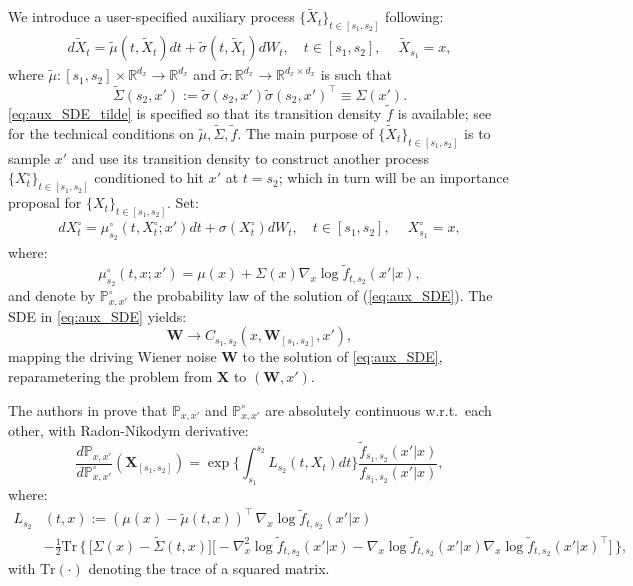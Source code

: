 \documentclass[english,13pt]{article}
\numberwithin{equation}{section}
\begin{document}
We introduce a user-specified auxiliary process $\{\tilde{X}_t\}_{t\in[s_1,s_2]}$ following:
%
\begin{align}
\label{eq:aux_SDE_tilde}
d \tilde X_{t} = \tilde \mu(t,\tilde X_{t})dt + \tilde \sigma(t,\tilde X_{t})dW_{t}, \quad t\in[s_1,s_2],\quad~\tilde{X}_{s_1} =x, 
\end{align}
%
where $\tilde \mu:[s_1,s_2]\times\mathbb{R}^{d_x}\rightarrow\mathbb{R}^{d_x}$ and $\tilde \sigma:\mathbb{R}^{d_x}\rightarrow\mathbb{R}^{d_x\times d_x}$ is
such that 
$$
\tilde \Sigma(s_2,x'):= \tilde \sigma(s_2,x') \tilde \sigma(s_2,x')^{\top} \equiv \Sigma(x').
$$ 
\eqref{eq:aux_SDE_tilde} is specified so that its transition density $\tilde{f}$ is available; see \cite[Section 2.2]{schauer} for the technical conditions on $\tilde \mu, \tilde \Sigma, \tilde f$. 
The main purpose of $\{\tilde X_t\}_{t\in[s_1,s_2]}$ is to sample $x'$ and use its transition density to construct another process $\{X_t^\circ\}_{t\in[s_1,s_2]}$ conditioned to hit $x'$ at $t=s_2$; which in turn will be an importance proposal for $\{X_t\}_{t\in[s_1,s_2]}$.  Set:
\begin{align}
\label{eq:aux_SDE}
d X^\circ_{t} = \mu_{s_2}^{\circ}(t,X^{\circ}_{t}; x')dt + \sigma(X^{\circ}_{t})dW_{t}, \quad t\in[s_1,s_2],\quad~X^{\circ}_{s_1} =x, 
\end{align}
where:
$$
\mu_{s_2}^{\circ}(t,x;x')=\mu(x)+\Sigma(x)\nabla_x\log\tilde{f}_{t,s_2}(x'|x),
$$ 
and denote by
 $\mathbb{P}^\circ_{x,x'}$ the probability law of the solution of (\ref{eq:aux_SDE}). %
The SDE in \eqref{eq:aux_SDE} yields: 
\begin{equation}
\mathbf{W}\rightarrow C_{s_1,s_2}(x,\mathbf{W}_{[s_1,s_2]},x'),
\label{eq:map}
\end{equation} 
mapping the driving Wiener noise $\mathbf{W}$ to the solution of \eqref{eq:aux_SDE}, reparametering the problem from $\mathbf{X}$ to $(\mathbf{W},x')$.

The authors in \cite{schauer} prove that $\mathbb{P}_{x,x'}$ and $\mathbb{P}^\circ_{x,x'}$ are absolutely continuous w.r.t.~each other, with Radon-Nikodym derivative: 
\begin{equation}
\frac{d\mathbb{P}_{x,x'} }{d \mathbb{P}^\circ_{x,x'} }(\mathbf{X}_{[s_1,s_2]})=
\exp\Big\{  \int_{s_1}^{s_2} L_{s_2}(t,X_t)dt\Big\}  \frac{ \tilde{f}_{s_1,s_2}(x'|x)}{f_{s_1,s_2}(x'|x)},
\label{eq:density}
\end{equation}
where: 
\begin{align*}
L_{s_2}&(t,x):=\left(\mu(x)- \tilde{\mu}(t,x)\right)^{\top}\, \nabla_x\log\tilde{f}_{t,s_2}(x'|x)\\
&-\frac{1}{2}\textrm{Tr}\,\Big\{\,\big[ \Sigma(x)-\tilde{\Sigma}(t,x)\big] \big[ -\nabla_x^2\log\tilde{f}_{t,s_2}(x'|x)-\nabla_x\log\tilde{f}_{t,s_2}(x'|x)\nabla_x\log\tilde{f}_{t,s_2}(x'|x)^{\top} \big]\,\Big\} ,         
\end{align*}
with $\textrm{Tr}(\cdot)$ denoting the trace of a squared matrix. 
\end{document}

